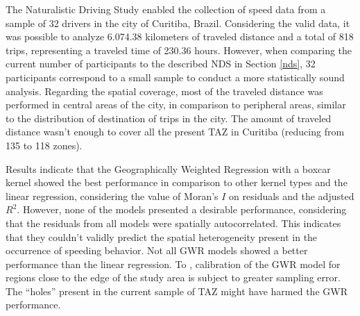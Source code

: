 












The Naturalistic Driving Study enabled the collection of speed data from a sample of 32 drivers in the city of Curitiba, Brazil. Considering the valid data, it was possible to analyze 6.074.38 kilometers of traveled distance and a total of 818 trips, representing a traveled time of 230.36 hours. However, when comparing the current number of participants to the described NDS in Section \ref{nds}, 32 participants correspond to a small sample to conduct a more statistically sound analysis. Regarding the spatial coverage, most of the traveled distance was performed in central areas of the city, in comparison to peripheral areas, similar to the distribution of destination of trips in the city. The amount of traveled distance wasn't enough to cover all the present TAZ in Curitiba (reducing from 135 to 118 zones).

Results indicate that the Geographically Weighted Regression with a boxcar kernel showed the best performance in comparison to other kernel types and the linear regression, considering the value of Moran's $I$ on residuals and the adjusted $R^2$. However, none of the models presented a desirable performance, considering that the residuals from all models were spatially autocorrelated. This indicates that they couldn't validly predict the spatial heterogeneity present in the occurrence of speeding behavior. Not all GWR models showed a better performance than the linear regression. To \textcite{Brunsdon2010}, calibration of the GWR model for regions close to the edge of the study area is subject to greater sampling error. The ``holes'' present in the current sample of TAZ might have harmed the GWR performance. 


